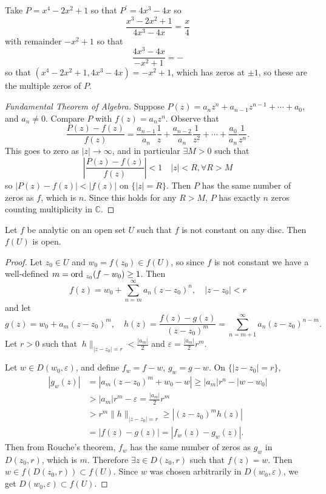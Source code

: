 Take $P = x^4 - 2x^2 + 1$ so that $P^\prime = 4x^3 - 4x$
so
$$
  \frac{x^3 - 2x^2 + 1}{4x^3 - 4x}
= \frac{x}{4}
$$
with remainder $-x^2 + 1$ so that
$$
  \frac{4x^3 - 4x}{-x^2 + 1}
= -
$$
so that $(x^4 - 2x^2 + 1, 4x^3 - 4x) = -x^2 + 1$, which has
zeros at $\pm 1$, so these are the multiple zeros of $P$.

\begin{proof}[Fundamental Theorem of Algebra]
Suppose $P(z) = a_n z^n + a_{n-1} z^{n-1} + \cdots + a_0$, and
$a_n \neq 0$. Compare $P$ with $f(z) = a_n z^n$. Observe that
$$
  \frac{P(z) - f(z)}{f(z)}
= \frac{a_{n-1}}{a_n}\frac{1}{z}
+ \frac{a_{n-2}}{a_n}\frac{1}{z^2}
+ \cdots
+ \frac{a_0}{a_n} \frac{1}{z^n}.
$$
This goes to zero as $|z| \to \infty$, and in particular
$\exists M > 0$ such that
$$
  \left|\frac{P(z) - f(z)}{f(z)}\right|
< 1 \quad |z| < R, \forall R > M
$$
so $|P(z) - f(z)| < |f(z)|$ on $\{|z| = R\}$. Then
$P$ has the same number of zeros as $f$, which is $n$.
Since this holds for any $R > M$, $P$ has exactly $n$
zeros counting multiplicity in $\mathbb{C}$.
\end{proof}

\begin{theorem}
Let $f$ be analytic on an open set $U$ such that $f$
is not constant on any disc. Then $f(U)$ is open.
\end{theorem}

\begin{proof}
Let $z_0 \in U$ and $w_0 = f(z_0) \in f(U)$, so
since $f$ is not constant we have a well-defined
$m = \mathrm{ord}~_{z_0} (f - w_0) \geq 1$. Then
$$
f(z) = w_0 + \sum_{n=m}^\infty a_n (z - z_0)^n, \quad |z - z_0| < r
$$
and let
$$
g(z) = w_0 + a_m (z - z_0)^m, \quad
h(z) = \frac{f(z) - g(z)}{(z - z_0)^m}
     = \sum_{n=m+1}^\infty a_n (z - z_0)^{n - m}.
$$
Let $r > 0$ such that
$\ h \|_{|z - z_0| = r} < \frac{|a_m|}{2}$ and
$\varepsilon = \frac{|a_m|}{2} r^m$.

Let $w \in D(w_0, \varepsilon)$, and define
$f_w = f - w$, $g_w = g - w$. On $\{|z - z_0| = r\}$,
\begin{align*}
      |g_w(z)|
&=    |a_m (z - z_0)^m + w_0 - w|
 \geq |a_m| r^n - |w - w_0| \\
&>    |a_m|r^m -\varepsilon
 =    \frac{|a_m|}{2} r^m \\
&>    r^m \| h \|_{|z - z_0| = r}
 \geq |(z - z_0)^m h(z)| \\
&=    |f(z) - g(z)|
 =    |f_w(z) - g_w(z)|.
\end{align*}
Then from Rouche's theorem, $f_w$ has the same number of zeros as
$g_w$ in $D(z_0, r)$, which is $m$. Therefore
$\exists z \in D(z_0, r)$ such that $f(z) = w$. Then
$w \in f(D(z_0, r)) \subset f(U)$. Since $w$ was chosen arbitrarily
in $D(w_0, \varepsilon)$, we get $D(w_0, \varepsilon) \subset f(U)$.
\end{proof}

